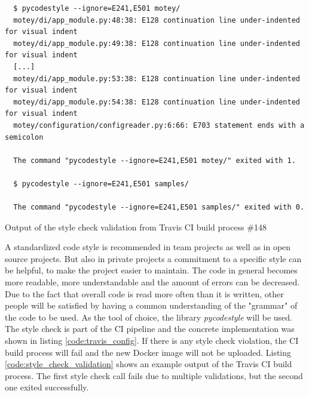 \begin{listing}[H]
  \begin{verbatim}
  $ pycodestyle --ignore=E241,E501 motey/
  motey/di/app_module.py:48:38: E128 continuation line under-indented for visual indent
  motey/di/app_module.py:49:38: E128 continuation line under-indented for visual indent
  [...]
  motey/di/app_module.py:53:38: E128 continuation line under-indented for visual indent
  motey/di/app_module.py:54:38: E128 continuation line under-indented for visual indent
  motey/configuration/configreader.py:6:66: E703 statement ends with a semicolon

  The command "pycodestyle --ignore=E241,E501 motey/" exited with 1.

  $ pycodestyle --ignore=E241,E501 samples/

  The command "pycodestyle --ignore=E241,E501 samples/" exited with 0.
  \end{verbatim}
  \caption[Output of the style check validation from Travis CI build process \#148]{Output of the style check validation from Travis CI build process \#148\autocite{Travis:Build:148}}
  \label{code:style_check_validation}
\end{listing}

A standardized code style is recommended in team projects as well as in open source projects.
But also in private projects a commitment to a specific style can be helpful, to make the project easier to maintain.
The code in general becomes more readable, more understandable and the amount of errors can be decreased.
Due to the fact that overall code is read more often than it is written, other people will be satisfied by having a common understanding of the "grammar" of the code to be used.
As the tool of choice, the library \textit{pycodestyle} will be used.
The style check is part of the \ac{CI} pipeline and the concrete implementation was shown in listing \ref{code:travis_config}.
If there is any style check violation, the \ac{CI} build process will fail and the new Docker image will not be uploaded.
Listing \ref{code:style_check_validation} shows an example output of the Travis \ac{CI} build process.
The first style check call fails due to multiple validations, but the second one exited successfully.\newline

